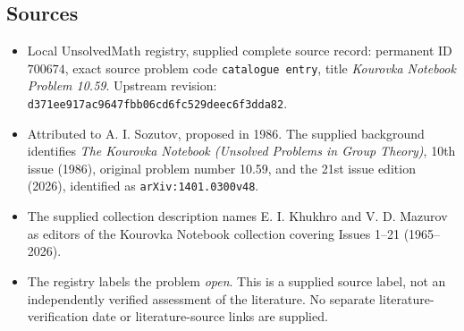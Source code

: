 \documentclass[11pt]{article}
\begin{document}
\subsection{Sources}
\begin{itemize}
\item Local UnsolvedMath registry, supplied complete source record: permanent ID \(700674\), exact source problem code \texttt{catalogue entry}, title \emph{Kourovka Notebook Problem 10.59}. Upstream revision: \texttt{d371ee917ac9647fbb06cd6fc529deec6f3dda82}.
\item Attributed to A. I. Sozutov, proposed in 1986. The supplied background identifies \emph{The Kourovka Notebook (Unsolved Problems in Group Theory)}, 10th issue (1986), original problem number 10.59, and the 21st issue edition (2026), identified as \texttt{arXiv:1401.0300v48}.
\item The supplied collection description names E. I. Khukhro and V. D. Mazurov as editors of the Kourovka Notebook collection covering Issues 1--21 (1965--2026).
\item The registry labels the problem \emph{open}. This is a supplied source label, not an independently verified assessment of the literature. No separate literature-verification date or literature-source links are supplied.
\end{itemize}
\end{document}
